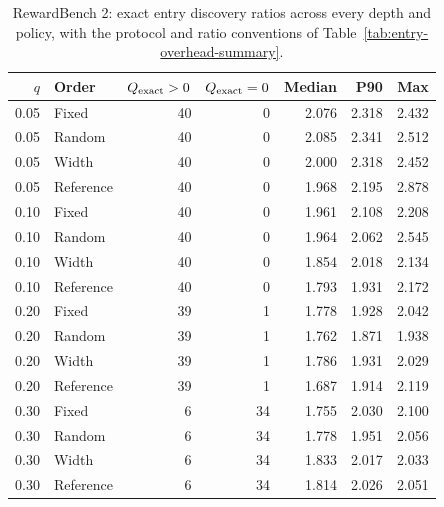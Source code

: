 \begin{table}[t]
\centering\small


\begin{tabular}{rlrrrrr}
\toprule
$q$ & Order & $Q_{\rm exact}>0$ & $Q_{\rm exact}=0$ & Median & P90 & Max \\
\midrule
0.05 & Fixed & 40 & 0 & 2.076 & 2.318 & 2.432 \\
0.05 & Random & 40 & 0 & 2.085 & 2.341 & 2.512 \\
0.05 & Width & 40 & 0 & 2.000 & 2.318 & 2.452 \\
0.05 & Reference & 40 & 0 & 1.968 & 2.195 & 2.878 \\
0.10 & Fixed & 40 & 0 & 1.961 & 2.108 & 2.208 \\
0.10 & Random & 40 & 0 & 1.964 & 2.062 & 2.545 \\
0.10 & Width & 40 & 0 & 1.854 & 2.018 & 2.134 \\
0.10 & Reference & 40 & 0 & 1.793 & 1.931 & 2.172 \\
0.20 & Fixed & 39 & 1 & 1.778 & 1.928 & 2.042 \\
0.20 & Random & 39 & 1 & 1.762 & 1.871 & 1.938 \\
0.20 & Width & 39 & 1 & 1.786 & 1.931 & 2.029 \\
0.20 & Reference & 39 & 1 & 1.687 & 1.914 & 2.119 \\
0.30 & Fixed & 6 & 34 & 1.755 & 2.030 & 2.100 \\
0.30 & Random & 6 & 34 & 1.778 & 1.951 & 2.056 \\
0.30 & Width & 6 & 34 & 1.833 & 2.017 & 2.033 \\
0.30 & Reference & 6 & 34 & 1.814 & 2.026 & 2.051 \\
\bottomrule
\end{tabular}
\caption{RewardBench 2: exact entry discovery ratios across every depth and policy, with the protocol and ratio conventions of Table~\ref{tab:entry-overhead-summary}.}
\label{tab:entry-overhead-all-0}
\end{table}
